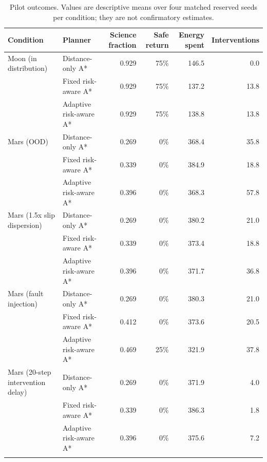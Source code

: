 \begin{table}[t]
\centering
\caption{Pilot outcomes. Values are descriptive means over four matched reserved seeds per condition; they are not confirmatory estimates.}
\label{tab:pilot}
\small
\begin{tabular}{llrrrr}
\toprule
Condition & Planner & Science fraction & Safe return & Energy spent & Interventions \\
\midrule
Moon (in distribution) & Distance-only A* & 0.929 & 75\% & 146.5 & 0.0 \\
 & Fixed risk-aware A* & 0.929 & 75\% & 137.2 & 13.8 \\
 & Adaptive risk-aware A* & 0.929 & 75\% & 138.8 & 13.8 \\
\addlinespace
Mars (OOD) & Distance-only A* & 0.269 & 0\% & 368.4 & 35.8 \\
 & Fixed risk-aware A* & 0.339 & 0\% & 384.9 & 18.8 \\
 & Adaptive risk-aware A* & 0.396 & 0\% & 368.3 & 57.8 \\
\addlinespace
Mars (1.5x slip dispersion) & Distance-only A* & 0.269 & 0\% & 380.2 & 21.0 \\
 & Fixed risk-aware A* & 0.339 & 0\% & 373.4 & 18.8 \\
 & Adaptive risk-aware A* & 0.396 & 0\% & 371.7 & 36.8 \\
\addlinespace
Mars (fault injection) & Distance-only A* & 0.269 & 0\% & 380.3 & 21.0 \\
 & Fixed risk-aware A* & 0.412 & 0\% & 373.6 & 20.5 \\
 & Adaptive risk-aware A* & 0.469 & 25\% & 321.9 & 37.8 \\
\addlinespace
Mars (20-step intervention delay) & Distance-only A* & 0.269 & 0\% & 371.9 & 4.0 \\
 & Fixed risk-aware A* & 0.339 & 0\% & 386.3 & 1.8 \\
 & Adaptive risk-aware A* & 0.396 & 0\% & 375.6 & 7.2 \\
\addlinespace
\bottomrule
\end{tabular}
\end{table}
